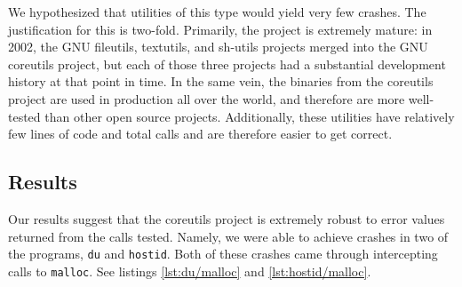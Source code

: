 We hypothesized that utilities of this type would yield very few crashes. The justification for this is two-fold. Primarily, the project is extremely mature: in 2002, the GNU fileutils, textutils, and sh-utils projects merged into the GNU coreutils project, but each of those three projects had a substantial development history at that point in time. In the same vein, the binaries from the coreutils project are used in production all over the world, and therefore are more well-tested than other open source projects. Additionally, these utilities have relatively few lines of code and total calls and are therefore easier to get correct.

\subsection{Results}
Our results suggest that the coreutils project is extremely robust to error values returned from the calls tested. Namely, we were able to achieve crashes in two of the programs, \texttt{du} and \texttt{hostid}. Both of these crashes came through intercepting calls to \texttt{malloc}. See listings \ref{lst:du/malloc} and \ref{lst:hostid/malloc}.
